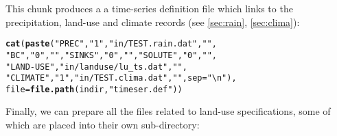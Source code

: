 \documentclass[article,nojss]{jss}\usepackage[]{graphicx}\usepackage[]{xcolor}
\makeatletter
\newcommand{\hlsng}[1]{\textcolor[rgb]{0.192,0.494,0.8}{#1}}%
\newcommand{\hldef}[1]{\textcolor[rgb]{0.345,0.345,0.345}{#1}}%
\newcommand{\hlkwc}[1]{\textcolor[rgb]{0.333,0.667,0.333}{#1}}%
\newcommand{\hlkwd}[1]{\textcolor[rgb]{0.737,0.353,0.396}{\textbf{#1}}}%
\newenvironment{kframe}{%
 \def\at@end@of@kframe{}%
 \ifinner\ifhmode%
  \def\at@end@of@kframe{\end{minipage}}%
  \begin{minipage}{\columnwidth}%
 \fi\fi%
 \def\FrameCommand##1{\hskip\@totalleftmargin \hskip-\fboxsep
 \colorbox{shadecolor}{##1}\hskip-\fboxsep
     \hskip-\linewidth \hskip-\@totalleftmargin \hskip\columnwidth}%
 \MakeFramed {\advance\hsize-\width
   \@totalleftmargin\z@ \linewidth\hsize
   \@setminipage}}%
 {\par\unskip\endMakeFramed%
 \at@end@of@kframe}
\newenvironment{knitrout}{}{} %
\makeatother
\begin{document}
This chunk produces a a time-series definition file which links to the precipitation, 
land-use and climate records (see \ref{sec:rain}, \ref{sec:clima}):

\begin{knitrout}
\color{fgcolor}\begin{kframe}
\begin{alltt}
 \hlkwd{cat}\hldef{(}\hlkwd{paste}\hldef{(}\hlsng{"PREC"}\hldef{,} \hlsng{"1"}\hldef{,} \hlsng{"in/TEST.rain.dat"}\hldef{,} \hlsng{""}\hldef{,}
           \hlsng{"BC"}\hldef{,} \hlsng{"0"}\hldef{,} \hlsng{""}\hldef{,} \hlsng{"SINKS"}\hldef{,}\hlsng{"0"}\hldef{,} \hlsng{""}\hldef{,} \hlsng{"SOLUTE"}\hldef{,} \hlsng{"0"}\hldef{,} \hlsng{""}\hldef{,}
           \hlsng{"LAND-USE"}\hldef{,} \hlsng{"in/landuse/lu_ts.dat"}\hldef{,} \hlsng{""}\hldef{,}
           \hlsng{"CLIMATE"}\hldef{,} \hlsng{"1"}\hldef{,} \hlsng{"in/TEST.clima.dat"}\hldef{,} \hlsng{""}\hldef{,} \hlkwc{sep}\hldef{=}\hlsng{"\textbackslash{}n"}\hldef{),}
  \hlkwc{file} \hldef{=} \hlkwd{file.path}\hldef{(indir,} \hlsng{"timeser.def"}\hldef{))}
\end{alltt}
\end{kframe}
\end{knitrout}

Finally, we can prepare all the files related to land-use specifications, some of which
are placed into their own sub-directory:
\end{document}
